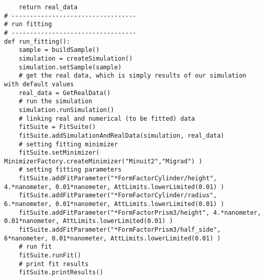 \begin{lstlisting}
    return real_data
# ----------------------------------
# run fitting 
# ----------------------------------
def run_fitting():
    sample = buildSample()
    simulation = createSimulation()
    simulation.setSample(sample)
    # get the real data, which is simply results of our simulation with default values
    real_data = GetRealData()   
    # run the simulation
    simulation.runSimulation()    
    # linking real and numerical (to be fitted) data
    fitSuite = FitSuite()
    fitSuite.addSimulationAndRealData(simulation, real_data)  
    # setting fitting minimizer
    fitSuite.setMinimizer( MinimizerFactory.createMinimizer("Minuit2","Migrad") ) 
    # setting fitting parameters
    fitSuite.addFitParameter("*FormFactorCylinder/height", 4.*nanometer, 0.01*nanometer, AttLimits.lowerLimited(0.01) )
    fitSuite.addFitParameter("*FormFactorCylinder/radius", 6.*nanometer, 0.01*nanometer, AttLimits.lowerLimited(0.01) )
    fitSuite.addFitParameter("*FormFactorPrism3/height", 4.*nanometer, 0.01*nanometer, AttLimits.lowerLimited(0.01) )
    fitSuite.addFitParameter("*FormFactorPrism3/half_side", 6*nanometer, 0.01*nanometer, AttLimits.lowerLimited(0.01) )
    # run fit
    fitSuite.runFit()
    # print fit results
    fitSuite.printResults()
\end{lstlisting}

